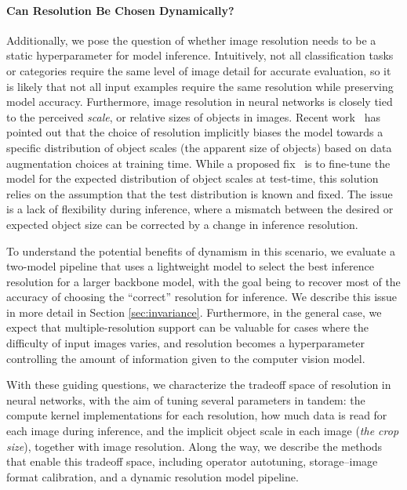 \paragraph{Can Resolution Be Chosen Dynamically?}
Additionally, we pose the question of whether image resolution needs to be a static hyperparameter for model inference.
Intuitively, not all classification tasks or categories require the same level of image detail for accurate evaluation, so it is likely that not all input examples require the same resolution while preserving model accuracy.
Furthermore, image resolution in neural networks is closely tied to the perceived \emph{scale}, or relative sizes of objects in images.
Recent work~\cite{touvron2019fixing} has pointed out that the choice of resolution implicitly biases the model towards a specific distribution of object scales (the apparent size of objects) based on data augmentation choices at training time.
While a proposed fix~\cite{touvron2019fixing} is to fine-tune the model for the expected distribution of object scales at test-time, this solution relies on the assumption that the test distribution is known and fixed.
The issue is a lack of flexibility during inference, where a mismatch between the desired or expected object size can be corrected by a change in inference resolution.

To understand the potential benefits of dynamism in this scenario, we evaluate a two-model pipeline that uses a lightweight model to select the best inference resolution for a larger backbone model, with the goal being to recover most of the accuracy of choosing the ``correct'' resolution for inference.
We describe this issue in more detail in Section \ref{sec:invariance}.
Furthermore, in the general case, we expect that multiple-resolution support can be valuable for cases where the difficulty of input images varies, and resolution becomes a hyperparameter controlling the amount of information given to the computer vision model.

With these guiding questions, we characterize the tradeoff space of resolution in neural networks, with the aim of tuning several parameters in tandem: the compute kernel implementations for each resolution, how much data is read for each image during inference, and the implicit object scale in each image (\emph{the crop size}), together with image resolution.
Along the way, we describe the methods that enable this tradeoff space, including operator autotuning, storage--image format calibration, and a dynamic resolution model pipeline.


